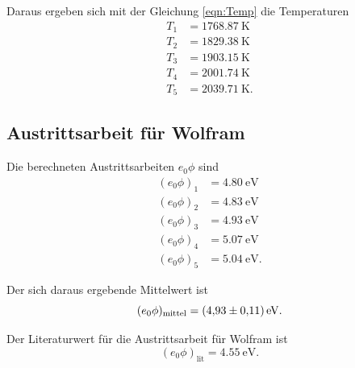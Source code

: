 \noindent Daraus ergeben sich mit der Gleichung \eqref{eqn:Temp} 
die Temperaturen
\begin{align*}
    T_\text{1} &= \SI{1768.87}{\kelvin} \\
    T_\text{2} &= \SI{1829.38}{\kelvin} \\
    T_\text{3} &= \SI{1903.15}{\kelvin} \\
    T_\text{4} &= \SI{2001.74}{\kelvin} \\
    T_\text{5} &= \SI{2039.71}{\kelvin}.
\end{align*}


\subsection{Austrittsarbeit für Wolfram}
Die berechneten Austrittsarbeiten $e_0 \phi$ sind
\begin{align*}
    (e_0 \phi)_\text{1} &= \SI{4.80}{\electronvolt} \\
    (e_0 \phi)_\text{2} &= \SI{4.83}{\electronvolt} \\
    (e_0 \phi)_\text{3} &= \SI{4.93}{\electronvolt} \\
    (e_0 \phi)_\text{4} &= \SI{5.07}{\electronvolt} \\
    (e_0 \phi)_\text{5} &= \SI{5.04}{\electronvolt}.
\end{align*}

\noindent Der sich daraus ergebende Mittelwert ist
\begin{equation*}
    (e_0 \phi)_\text{mittel} = \SI{4.93 \pm 0.11}{\electronvolt}.
\end{equation*}

\noindent Der Literaturwert für die Austrittsarbeit für
Wolfram \cite{wiki} ist
\begin{equation*}
    (e_0 \phi)_\text{lit} = \SI{4.55}{\electronvolt}.
\end{equation*}